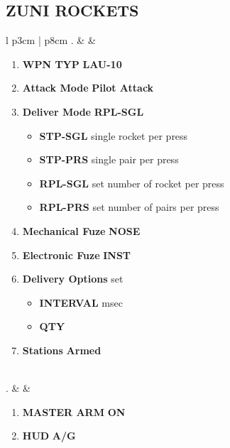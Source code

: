 \documentclass[8pt,usenames,dvipsnames,twoside]{article}
\begin{document}
		\subsection{ZUNI ROCKETS}
		\begin{center}
			\begin{tabular}{l p{3cm} | p{8cm}}
				. &  & 
				\begin{minipage}[t]{\linewidth}
					\vspace{-7pt}
					\begin{enumerate}[label=(\alph*)]
						\item \textbf{WPN TYP} \dotfill \textbf{LAU-10}
						\item \textbf{Attack Mode} \dotfill \textbf{Pilot Attack}
						\item \textbf{Deliver Mode} \dotfill \textbf{RPL-SGL}
						\begin{itemize}
							\item \textbf{STP-SGL} single rocket per press
							\item \textbf{STP-PRS} single pair per press
							\item \textbf{RPL-SGL} set number of rocket per press
							\item \textbf{RPL-PRS} set number of pairs per press
						\end{itemize}
						\item \textbf{Mechanical Fuze} \dotfill \textbf{NOSE}
						\item \textbf{Electronic Fuze} \dotfill \textbf{INST}
						\item \textbf{Delivery Options} \dotfill set 
						\begin{itemize}
							\item \textbf{INTERVAL}  msec
							\item \textbf{QTY} 
						\end{itemize}
						\item \textbf{Stations} \dotfill \textbf{Armed}
					\end{enumerate}
				\end{minipage} \\
				. &  & 
				\begin{minipage}[t]{\linewidth}
					\vspace{-7pt}
					\begin{enumerate}[label=(\alph*)]
						\item \textbf{MASTER ARM} \dotfill \textbf{ON}
						\item \textbf{HUD} \dotfill \textbf{A/G}

\end{enumerate}
\end{minipage}
\end{tabular}
\end{center}
\end{document}
